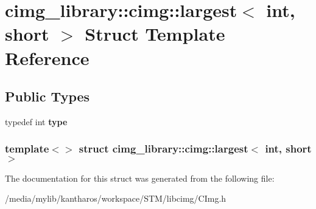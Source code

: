 \hypertarget{structcimg__library_1_1cimg_1_1largest_3_01int_00_01short_01_4}{
\section{cimg\_\-library::cimg::largest$<$ int, short $>$ Struct Template Reference}
\label{structcimg__library_1_1cimg_1_1largest_3_01int_00_01short_01_4}
}
\subsection*{Public Types}
\begin{DoxyCompactItemize}
\item 
\hypertarget{structcimg__library_1_1cimg_1_1largest_3_01int_00_01short_01_4_a446604cec17fec76b54e439c845f32f0}{
typedef int {\bfseries type}}
\label{structcimg__library_1_1cimg_1_1largest_3_01int_00_01short_01_4_a446604cec17fec76b54e439c845f32f0}

\end{DoxyCompactItemize}
\subsubsection*{template$<$$>$ struct cimg\_\-library::cimg::largest$<$ int, short $>$}



The documentation for this struct was generated from the following file:\begin{DoxyCompactItemize}
\item 
/media/mylib/kantharos/workspace/STM/libcimg/CImg.h\end{DoxyCompactItemize}
